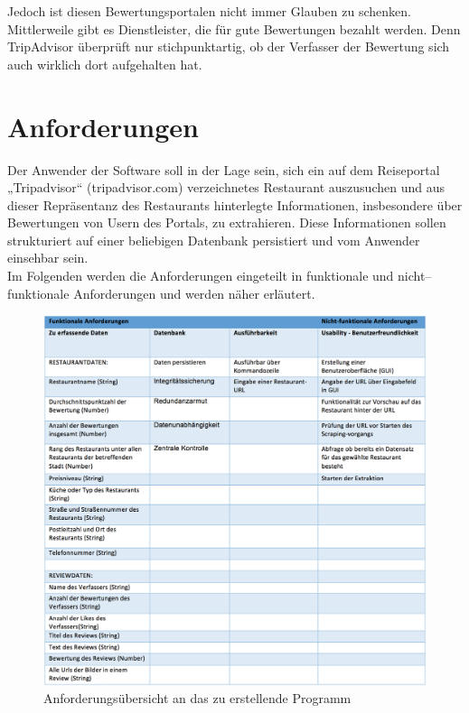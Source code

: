 \documentclass[a4paper,oneside,12pt]{report}
\begin{document}
			Jedoch ist diesen Bewertungsportalen nicht immer Glauben zu schenken. Mittlerweile gibt es Dienstleister, die für gute Bewertungen bezahlt werden. Denn TripAdvisor überprüft nur stichpunktartig, ob der Verfasser der Bewertung sich auch wirklich dort aufgehalten hat. \cite{bib-taSued}
	
	
	\chapter{Anforderungen}	
	
	    Der Anwender der Software soll in der Lage sein, sich ein auf dem Reiseportal „Tripadvisor“ (tripadvisor.com) verzeichnetes Restaurant auszusuchen und aus dieser Repräsentanz des Restaurants hinterlegte Informationen, insbesondere über Bewertungen von Usern des Portals, zu extrahieren. Diese Informationen sollen strukturiert auf einer beliebigen Datenbank persistiert und vom Anwender einsehbar sein.
	    \\
       Im Folgenden werden die Anforderungen eingeteilt in funktionale und nicht–funktionale Anforderungen und werden näher erläutert.

       \begin{figure}[h]
				\centering
				\begin{minipage}[b]{1.0\textwidth}
					\includegraphics[width=\textwidth]{Bilder/TabAnforderungen.png}
				\end{minipage}
				\centering
				\caption[Anforderungsübersicht an das zu erstellende Programm]{Anforderungsübersicht an das zu erstellende Programm} 
				\label{TabAnforderungen}
			\end{figure}
	
\end{document}
